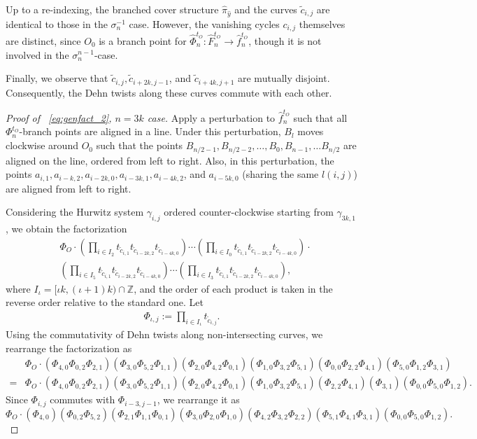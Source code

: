 \documentclass[10pt,a4paper,reqno]{amsart}
\theoremstyle{definition}
\numberwithin{equation}{section}
\numberwithin{figure}{section}
\newcommand{\Z}{\mathbb{Z}}
\newcommand{\arrowr}{\rightarrow}
\begin{document}
Up to a re-indexing, the branched cover structure $\hat{\pi}_{\hat{y}}$ and the curves $\tilde{c}_{i,j}$ are identical to those in the $\sigma_n^{-1}$ case.
However, the vanishing cycles $c_{i,j}$ themselves are distinct, since $O_0$ is a branch point for $\hat{\Phi}_n^{t_O}: \hat{F}_n^{t_O} \arrowr \hat{f}_n^{t_O}$, 
though it is not involved in the $\sigma_n^{n-1}$-case.

Finally, we observe that $\tilde{c}_{i,j}, \tilde{c}_{i+2k, j-1}$, and $\tilde{c}_{i+4k, j+1}$ are mutually disjoint. 
Consequently, the Dehn twists along these curves commute with each other.

\begin{proof}[Proof of ~\eqref{eq:genfact_2}, $n=3k$ case]
Apply a perturbation to $\hat{f}_n^{t_O}$ such that all $\Phi_n^{t_O}$-branch points are aligned in a line.
Under this perturbation, $B_{l}$ moves clockwise around $O_0$
such that the points $B_{n/2-1}, B_{n/2-2}, \dots, B_0, B_{n-1},\dots B_{n/2}$ are aligned on the line, ordered from left to right.
Also, in this perturbation, the points $a_{i,1}, a_{i-k,2}, a_{i-2k,0}, a_{i-3k,1}, a_{i-4k,2}$, and $a_{i-5k, 0}$ (sharing the same $l(i,j)$) 
are aligned from left to right.

Considering the Hurwitz system $\gamma_{i,j}$ ordered counter-clockwise starting from $\gamma_{3k,1}$, 
we obtain the factorization
\begin{align*}
&\Phi_O \cdot \left( \prod_{i\in I_2} t_{\tilde{c}_{i,1}}t_{\tilde{c}_{i-2k,2}}t_{\tilde{c}_{i-4k,0}} \right) \cdots
\left( \prod_{i\in I_0} t_{\tilde{c}_{i,1}}t_{\tilde{c}_{i-2k,2}}t_{\tilde{c}_{i-4k,0}} \right)\cdot \\
&\left( \prod_{i\in I_5} t_{\tilde{c}_{i,1}}t_{\tilde{c}_{i-2k,2}}t_{\tilde{c}_{i-4k,0}} \right) \cdots
\left( \prod_{i\in I_3} t_{\tilde{c}_{i,1}}t_{\tilde{c}_{i-2k,2}}t_{\tilde{c}_{i-4k,0}} \right), 
\end{align*}
where $I_\iota=[\iota k,(\iota+1)k) \cap \Z$, and the order of each product is taken in the reverse order relative to the standard one.
Let 
\begin{align}\Phi_{\iota,j}:=\prod_{i \in I_\iota} t_{\tilde{c}_{i, j}}.
\end{align} 
Using the commutativity of Dehn twists along non-intersecting curves, we rearrange the factorization as
\begin{align*}
&\Phi_O \cdot (\Phi_{4,0} \Phi_{0,2}\Phi_{2,1})(\Phi_{3,0} \Phi_{5,2}\Phi_{1,1})(\Phi_{2,0} \Phi_{4,2}\Phi_{0,1})
(\Phi_{1,0} \Phi_{3,2}\Phi_{5,1})(\Phi_{0,0} \Phi_{2,2}\Phi_{4,1})(\Phi_{5,0} \Phi_{1,2}\Phi_{3,1})\\
=&\Phi_O \cdot (\Phi_{4,0} \Phi_{0,2}\Phi_{2,1})(\Phi_{3,0} \Phi_{5,2}\Phi_{1,1})(\Phi_{2,0} \Phi_{4,2}\Phi_{0,1})
(\Phi_{1,0} \Phi_{3,2}\Phi_{5,1})( \Phi_{2,2}\Phi_{4,1})(\Phi_{3,1})(\Phi_{0,0}\Phi_{5,0} \Phi_{1,2}).
\end{align*}
Since $\Phi_{i,j}$ commutes with $\Phi_{i-3, j-1}$, we rearrange it as
\[\Phi_O \cdot (\Phi_{4,0})( \Phi_{0,2}\Phi_{5,2})(\Phi_{2,1}\Phi_{1,1}\Phi_{0,1})(\Phi_{3,0} \Phi_{2,0}\Phi_{1,0} )
(\Phi_{4,2} \Phi_{3,2} \Phi_{2,2})(\Phi_{5,1}\Phi_{4,1}\Phi_{3,1})(\Phi_{0,0}\Phi_{5,0} \Phi_{1,2}).\]


\end{proof}
\end{document}
